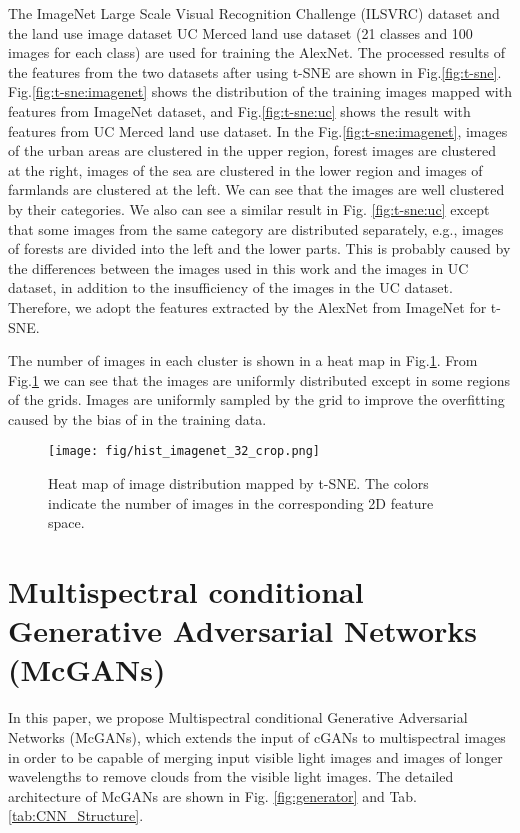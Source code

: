 \documentclass[10pt,twocolumn,letterpaper]{article}
\begin{document}
The ImageNet Large Scale Visual Recognition Challenge (ILSVRC) dataset \cite{deng2009imagenet} and the land use image dataset UC Merced land use dataset \cite{yang2010bag} (21 classes and 100 images for each class) are used for training the AlexNet. The processed results of the features from the two datasets after using t-SNE are shown in Fig.\ref{fig:t-sne}. Fig.\ref{fig:t-sne:imagenet} shows the distribution of the training images mapped with features from ImageNet dataset, and Fig.\ref{fig:t-sne:uc} shows the result with features from UC Merced land use dataset. In the Fig.\ref{fig:t-sne:imagenet}, images of the urban areas are clustered in the upper region, forest images are clustered at the right, images of the sea are clustered  in the lower region and images of farmlands are clustered  at the left. We can see that the images are well clustered by their categories. We also can see a similar result in Fig. \ref{fig:t-sne:uc} except that some images from the same category are distributed separately, e.g., images of forests are divided into the left and the lower parts. This is probably caused by the differences between the images used in this work and the images in UC dataset, in addition to the insufficiency of the images in the UC dataset. Therefore, we adopt the features extracted by the AlexNet from ImageNet for t-SNE.

The number of images in each cluster is shown in a heat map in Fig.\ref{fig:hist_t-SNE}. From Fig.\ref{fig:hist_t-SNE} we can see that the images are uniformly distributed except in some regions of the grids. Images are uniformly sampled by the grid to improve the overfitting caused by the bias of in the training data.

\begin{figure}[htpb]
\begin{center}
\hspace*{0mm}\texttt{[image: fig/hist\_imagenet\_32\_crop.png]}
\caption{Heat map of image distribution mapped by t-SNE. The colors indicate the number of images in the corresponding 2D feature space.}
\label{fig:hist_t-SNE}
\end{center}
\end{figure}

\section{Multispectral conditional Generative Adversarial Networks (McGANs)}
In this paper, we propose Multispectral conditional Generative Adversarial Networks (McGANs), which extends the input of cGANs to multispectral images in order to be capable of merging input visible light images and images of longer wavelengths to remove clouds from the visible light images. The detailed architecture of McGANs are shown in Fig. \ref{fig:generator} and Tab.\ref{tab:CNN_Structure}.
\end{document}
